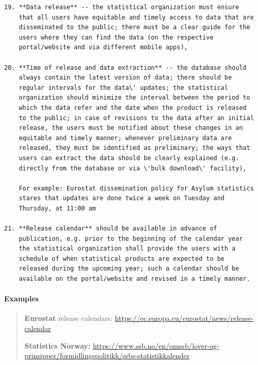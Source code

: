 \documentclass[
]{article}
\begin{document}
\begin{verbatim}
19. **Data release** -- the statistical organization must ensure
    that all users have equitable and timely access to data that are
    disseminated to the public; there must be a clear guide for the
    users where they can find the data (on the respective
    portal/website and via different mobile apps),

20. **Time of release and data extraction** -- the database should
    always contain the latest version of data; there should be
    regular intervals for the data\' updates; the statistical
    organization should minimize the interval between the period to
    which the data refer and the date when the product is released
    to the public; in case of revisions to the data after an initial
    release, the users must be notified about these changes in an
    equitable and timely manner; whenever preliminary data are
    released, they must be identified as preliminary; the ways that
    users can extract the data should be clearly explained (e.g.
    directly from the database or via \'bulk download\' facility),

    For example: Eurostat dissemination policy for Asylum statistics
    stares that updates are done twice a week on Tuesday and
    Thursday, at 11:00 am

21. **Release calendar** should be available in advance of
    publication, e.g. prior to the beginning of the calendar year
    the statistical organization shall provide the users with a
    schedule of when statistical products are expected to be
    released during the upcoming year; such a calendar should be
    available on the portal/website and revised in a timely manner.
\end{verbatim}

\hypertarget{examples}{%
\paragraph{Examples}\label{examples}}

\begin{quote}
\textbf{Eurostat} release calendars:
\url{https://ec.europa.eu/eurostat/news/release-calendar}

\textbf{Statistics Norway:}
\url{https://www.ssb.no/en/omssb/lover-og-prinsipper/formidlingspolitikk/ssbs-statistikkalender}
\end{quote}
\end{document}

